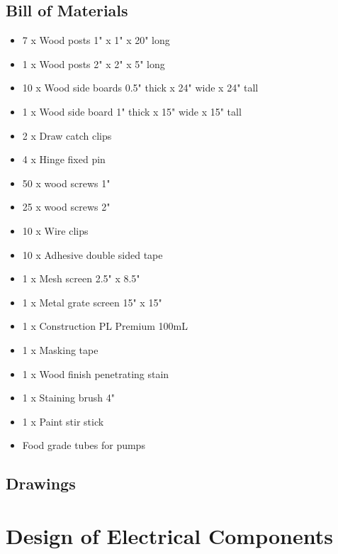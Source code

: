 \documentclass[12pt, titlepage]{article}
\begin{document}
\subsection{Bill of Materials}
\begin{itemize}
        \item 7 x Wood posts 1" x 1" x 20" long
        \item 1 x Wood posts 2" x 2" x 5" long
        \item 10 x Wood side boards 0.5" thick x 24" wide x 24" tall
        \item 1 x Wood side board 1" thick x 15" wide x 15" tall
        \item 2 x Draw catch clips
        \item 4 x Hinge fixed pin
        \item 50 x wood screws 1"
        \item 25 x wood screws 2"
        \item 10 x Wire clips
        \item 10 x Adhesive double sided tape
        \item 1 x Mesh screen 2.5" x 8.5"
        \item 1 x Metal grate screen 15" x 15"
        \item 1 x Construction PL Premium 100mL
        \item 1 x Masking tape
        \item 1 x Wood finish penetrating stain
        \item 1 x Staining brush 4"
        \item 1 x Paint stir stick
        \item Food grade tubes for pumps
    \end{itemize}   

\subsection{Drawings}

\section{Design of Electrical Components}
\\ 
\end{document}
